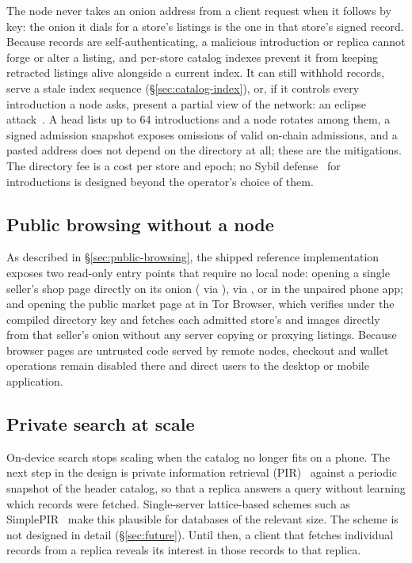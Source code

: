 The node never takes an onion address from a client request when it follows by key: the onion it dials for a store's listings is the one in that store's signed record. Because records are self-authenticating, a malicious introduction or replica cannot forge or alter a listing, and per-store catalog indexes prevent it from keeping retracted listings alive alongside a current index. It can still withhold records, serve a stale index sequence (\S\ref{sec:catalog-index}), or, if it controls every introduction a node asks, present a partial view of the network: an eclipse attack~\citep{heilman2015eclipse}. A head lists up to 64 introductions and a node rotates among them, a signed admission snapshot exposes omissions of valid on-chain admissions, and a pasted address does not depend on the directory at all; these are the mitigations. The directory fee is a cost per store and epoch; no Sybil defense~\citep{douceur2002sybil} for introductions is designed beyond the operator's choice of them.

\subsection{Public browsing without a node}

As described in \S\ref{sec:public-browsing}, the shipped reference implementation exposes two read-only entry points that require no local node: opening a single seller's shop page directly on its onion ( via ), via , or in the unpaired phone app; and opening the public market page at \code{/} in Tor Browser, which verifies  under the compiled directory key and fetches each admitted store's  and images directly from that seller's onion without any server copying or proxying listings. Because browser pages are untrusted code served by remote nodes, checkout and wallet operations remain disabled there and direct users to the desktop or mobile application.

\subsection{Private search at scale}

On-device search stops scaling when the catalog no longer fits on a phone. The next step in the design is private information retrieval (PIR)~\citep{chor1995pir} against a periodic snapshot of the header catalog, so that a replica answers a query without learning which records were fetched. Single-server lattice-based schemes such as SimplePIR~\citep{henzinger2023simplepir} make this plausible for databases of the relevant size. The scheme is not designed in detail (\S\ref{sec:future}). Until then, a client that fetches individual records from a replica reveals its interest in those records to that replica.
